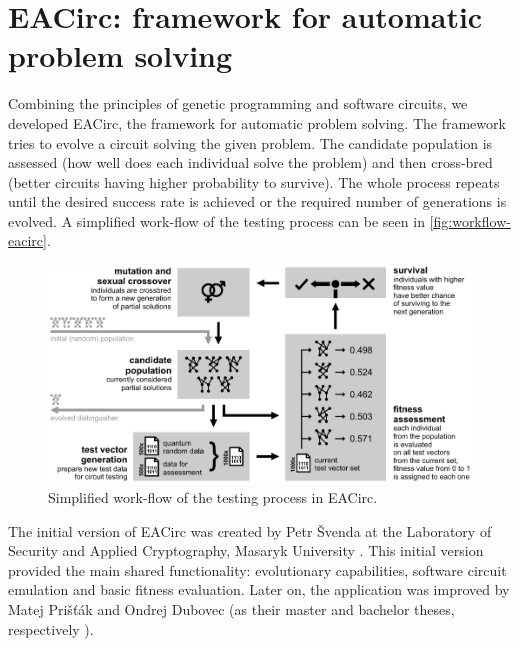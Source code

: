 \documentclass[12pt,oneside]{fithesis2}		%
\renewcommand{\_}{\leavevmode \kern0.0em\vbox{\hrule width0.4em}}
\begin{document}
\section{EACirc: framework for automatic problem solving}
\label{sec:eacirc-principles}

Combining the principles of genetic programming and software circuits, we developed EACirc, the framework for automatic
problem solving. The framework tries to evolve a circuit solving the given problem. The candidate population is assessed
(how well does each individual solve the problem) and then cross-bred (better circuits having higher probability to survive).
The whole process repeats until the desired success rate is achieved or the required number of generations is evolved.
A simplified work-flow of the testing process can be seen in \autoref{fig:workflow-eacirc}.

\begin{figure}[b!]
\centering
\includegraphics[width=\textwidth]{images/workflow-eacirc}
\caption{Simplified work-flow of the testing process in EACirc.}
\label{fig:workflow-eacirc}
\end{figure}

The initial version of EACirc was created by Petr Švenda at 
the Laboratory of Security and Applied Cryptography, Masaryk University \parencite{labak}.
This initial version provided the main shared functionality: evolutionary capabilities, software circuit emulation
and basic fitness evaluation. Later on, the application was improved by Matej Prišťák and Ondrej Dubovec 
(as their master and bachelor theses, respectively \parencite{thesis-pristak, thesis-dubovec}).
\end{document}
